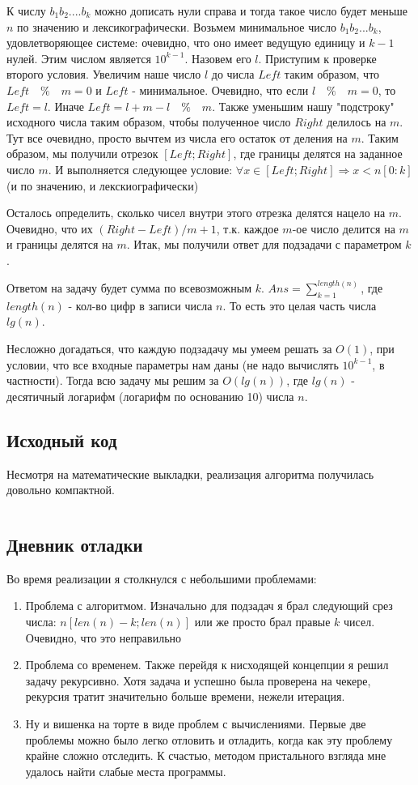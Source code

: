 \documentclass[12pt]{article}
\begin{document}
	К числу $b_1b_2....b_k$ можно дописать нули справа и тогда такое число будет меньше $n$ по значению и лексикографически. Возьмем минимальное число $b_1b_2...b_k$, удовлетворяющее системе: очевидно, что оно имеет ведущую единицу и $k-1$ нулей. Этим числом является $10^{k-1}$. Назовем его $l$. 
	Приступим к проверке второго условия. Увеличим наше число $l$ до числа $Left$ таким образом, что $Left \quad \% \quad m = 0$ и $Left$ - минимальное. Очевидно, что если $l  \quad \% \quad  m = 0$, то $Left = l$. Иначе $Left = l + m - l  \quad \% \quad  m$.
	Также уменьшим нашу "подстроку" исходного числа таким образом, чтобы полученное число $Right$ делилось на $m$. Тут все очевидно, просто вычтем  из числа его остаток от деления на $m$. 
	Таким образом, мы получили отрезок $[Left; Right]$, где границы делятся на заданное число $m$. И выполняется следующее условие: $\forall x \in [Left; Right] \Rightarrow x < n[0:k]$ (и по значению, и лекскиографически)
	
	Осталось определить, сколько чисел внутри этого отрезка делятся нацело на $m$. Очевидно, что их $(Right - Left) / m + 1$, т.к. каждое $m$-ое число делится на $m$ и границы делятся на $m$.
	Итак, мы получили ответ для подзадачи с параметром $k$.
	
	Ответом на задачу будет сумма по всевозможным $k$. 
	$Ans = \sum\limits_{k = 1}^{length(n)}$, где $length(n)$ - кол-во цифр в записи числа $n$. То есть это целая часть числа $lg(n)$.
	
	Несложно догадаться, что каждую подзадачу мы умеем решать за $O(1)$, при условии, что все входные параметры нам даны (не надо вычислять $10^{k-1}$, в частности).
	Тогда всю задачу мы решим за $O(lg (n))$, где $lg(n)$ - десятичный логарифм (логарифм по основанию 10) числа $n$.
	\subsection*{Исходный код}
	Несмотря на математические выкладки, реализация алгоритма получилась довольно компактной.
	
	\inputminted[breaklines]{C++}{../src/main.cpp}
	
	\subsection*{Дневник отладки}
	Во время реализации я столкнулся с небольшими проблемами:
	\begin{enumerate}
		\item Проблема с алгоритмом. Изначально для подзадач я брал следующий срез числа: $n[len(n) - k; len(n)]$ или же просто брал правые $k$ чисел. Очевидно, что это неправильно
		\item Проблема со временем. Также перейдя к нисходящей концепции я решил задачу рекурсивно. Хотя задача и успешно была проверена на чекере, рекурсия тратит значительно больше времени, нежели итерация.
		\item Ну и вишенка на торте в виде проблем с вычислениями. Первые две проблемы можно было легко отловить и отладить, когда как эту проблему крайне сложно отследить. К счастью, методом пристального взгляда мне удалось найти слабые места программы.
	\end{enumerate}
\end{document}
